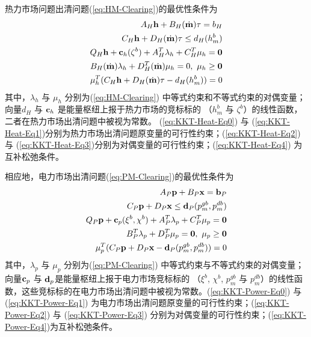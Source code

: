 热力市场问题出清问题(\ref{eq:HM-Clearing})的最优性条件为
\begin{subequations}
\label{eq:KKT-Heat}
\begin{align}
A_H{\bf h} + B_H(\dot {\bf m})\tau = b_H \label{eq:KKT-Heat-Eq0} \\
C_H{\bf h} + D_H(\dot {\bf m})\tau \le d_H(h^b_m) \label{eq:KKT-Heat-Eq1} \\
Q_H{\bf h} + {\bf c}_h (\zeta^b) + A_H^T \lambda_h + C_H^T \mu_h = {\bf 0} \label{eq:KKT-Heat-Eq2} \\
B_H(\dot {\bf m})\lambda_h + D_H^T(\dot {\bf m})\mu_h = 0,~
\mu_h \ge {\bf 0} \label{eq:KKT-Heat-Eq3} \\
{\mu_h ^T}( C_H {\bf h} + D_H (\dot {\bf m})\tau - d_H(h^b_m) )=0 \label{eq:KKT-Heat-Eq4}
\end{align}
\end{subequations}
其中，$\lambda_h$ 与 $\mu_h$ 分别为(\ref{eq:HM-Clearing}) 中等式约束和不等式约束的对偶变量；向量$d_H$ 与 ${\bf c}_h$ 是能量枢纽上报于热力市场的竞标标的 （$h^b_m$ 与 $\zeta^b$）的线性函数，二者在热力市场出清问题中被视为常数。 (\ref{eq:KKT-Heat-Eq0}) 与 (\ref{eq:KKT-Heat-Eq1})分别为热力市场出清问题原变量的可行性约束；(\ref{eq:KKT-Heat-Eq2}) 与 (\ref{eq:KKT-Heat-Eq3})分别为对偶变量的可行性约束；(\ref{eq:KKT-Heat-Eq4}) 为互补松弛条件。

相应地，电力市场出清问题(\ref{eq:PM-Clearing})的最优性条件为
\begin{subequations}
\label{eq:KKT-Power}
\begin{align}
A_P {\bf p} + B_P {\bf x} = {\bf b}_P \label{eq:KKT-Power-Eq0}\\
C_P {\bf p} + D_P {\bf x} \le {\bf d}_P(p^{gb}_m, p^{db}_m) \label{eq:KKT-Power-Eq1}\\
Q_P {\bf p} + {\bf c}_p (\xi^b,\chi^b) + A_P^T \lambda_p + C_P^T \mu_p ={\bf 0} \label{eq:KKT-Power-Eq2}\\
B_P^T\lambda_p + D_P^T\mu_p = {\bf 0},~\mu_p \ge {\bf 0}  \label{eq:KKT-Power-Eq3}\\
\mu_p ^T ( C_P {\bf p} + D_P{\bf x} - {\bf d}_P(p^{gb}_m, p^{db}_m) ) = 0 \label{eq:KKT-Power-Eq4}
\end{align}
\end{subequations}
其中，$\lambda_p$ 与 $\mu_p$ 分别为(\ref{eq:PM-Clearing}) 中等式约束与不等式约束的对偶变量；向量${\bf c}_p$ 与 ${\bf d}_p$是能量枢纽上报于电力市场竞标标的 （$\xi^b$, $\chi^b$, $p^{gb}_m$ 与 $p^{db}_m$）的线性函数，这些竞标标的在电力市场出清问题中被视为常数。(\ref{eq:KKT-Power-Eq0}) 与 (\ref{eq:KKT-Power-Eq1}) 为电力市场出清问题原变量的可行性约束；(\ref{eq:KKT-Power-Eq2}) 与 (\ref{eq:KKT-Power-Eq3}) 分别为对偶变量的可行性约束；(\ref{eq:KKT-Power-Eq4})为互补松弛条件。

